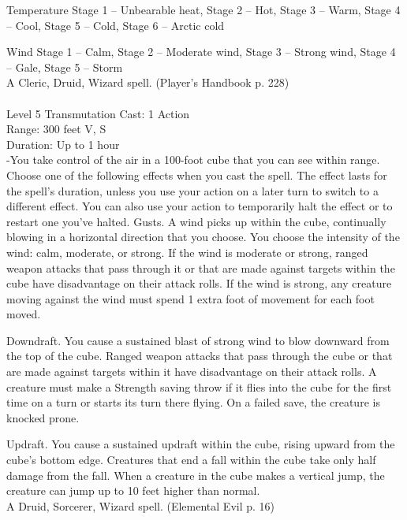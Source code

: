 \documentclass[10pt,twocolumn]{report}
\begin{document}
Temperature 
Stage 1 – Unbearable heat, 
Stage 2 – Hot, 
Stage 3 – Warm, 
Stage 4 – Cool, 
Stage 5 – Cold, 
Stage 6 – Arctic cold 

Wind 
Stage 1 – Calm, 
Stage 2 – Moderate wind, 
Stage 3 – Strong wind, 
Stage 4 – Gale, 
Stage 5 – Storm\\
A Cleric, Druid, Wizard spell. (Player's Handbook p. 228) \\


 \\
Level 5 \quad Transmutation \quad Cast: 1 Action\\
Range: 300 feet \quad V, S\\
Duration: Up to 1 hour \quad \\
-You take control of the air in a 100-foot cube that you can see within range. Choose one of the following effects when you cast the spell. The effect lasts for the spell’s duration, unless you use your action on a later turn to switch to a different effect. You can also use your action to temporarily halt the effect or to restart one you’ve halted.
Gusts. A wind picks up within the cube, continually blowing in a horizontal direction that you choose. You choose the intensity of the wind: calm, moderate, or strong. If the wind is moderate or strong, ranged weapon attacks that pass through it or that are made against targets within the cube have disadvantage on their attack rolls. If the wind is strong, any creature moving against the wind must spend 1 extra foot of movement for each foot moved.

Downdraft. You cause a sustained blast of strong wind to blow downward from the top of the cube. Ranged weapon attacks that pass through the cube
or that are made against targets within it have disadvantage on their attack rolls. A creature must make a Strength saving throw if it flies into the cube for the first time on a turn or starts its turn there flying. On a failed save, the creature is knocked prone.

Updraft. You cause a sustained updraft within the cube, rising upward from the cube’s bottom edge. Creatures that end a fall within the cube take only half damage from the fall. When a creature in the cube makes a vertical jump, the creature can jump up to 10 feet higher than normal.\\
A Druid, Sorcerer, Wizard spell. (Elemental Evil p. 16) \\
\end{document}

